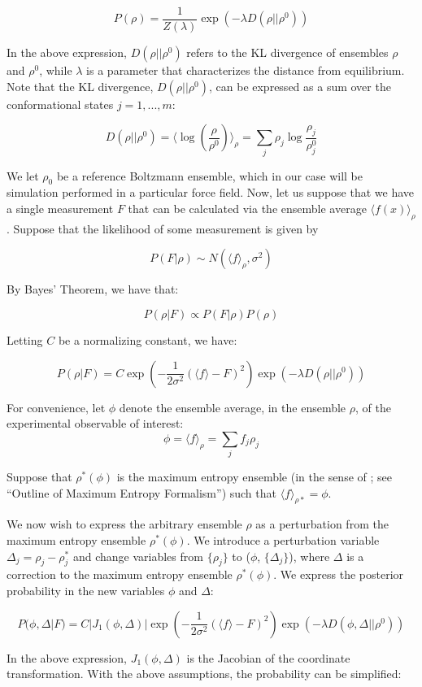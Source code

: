 \documentclass[12pt]{article}
\begin{document}
$$P(\rho) = \frac{1}{Z(\lambda)} \exp(- \lambda D(\rho || \rho^0))$$

In the above expression, $D(\rho || \rho^0)$ refers to the KL divergence of ensembles $\rho$ and $\rho^0$, while $\lambda$ is a parameter that characterizes the distance from equilibrium.  Note that the KL divergence, $D(\rho || \rho^0)$, can be expressed as a sum over the conformational states $j = 1, ..., m$:

$$D(\rho || \rho^0) = \langle \log(\frac{\rho}{\rho^0})\rangle_\rho = \sum_j \rho_j \log \frac{\rho_j}{\rho^0_j}$$

We let $\rho_0$ be a reference Boltzmann ensemble, which in our case will be simulation performed in a particular force field. Now, let us suppose that we have a single measurement $F$ that can be calculated via the ensemble average $\langle f(x) \rangle_\rho$.  Suppose that the likelihood of some measurement is given by

$$P(F|\rho) \sim N(\langle f\rangle_\rho, \sigma^2)$$

By Bayes' Theorem, we have that:

$$P(\rho | F) \propto P(F | \rho) P(\rho)$$

Letting $C$ be a normalizing constant, we have:

$$P(\rho | F) = C \exp(-\frac{1}{2\sigma^2} (\langle f \rangle - F)^2) \exp(-\lambda D(\rho || \rho^0))$$

For convenience, let $\phi$ denote the ensemble average, in the ensemble $\rho$, of the experimental observable of interest: 
$$\phi = \langle f \rangle_\rho = \sum_j f_j \rho_j$$

Suppose that $\rho^*(\phi)$ is the maximum entropy ensemble (in the sense of \cite{chodera2012}; see ``Outline of Maximum Entropy Formalism'') such that $\langle f \rangle_{\rho*} = \phi$.  

We now wish to express the arbitrary ensemble $\rho$ as a perturbation from the maximum entropy ensemble $\rho^*(\phi)$.  We introduce a perturbation variable $\Delta_j = \rho_j - \rho^*_j$ and change variables from $\{\rho_j\}$ to ($\phi$, $\{\Delta_j \}$), where $\Delta$ is a correction to the maximum entropy ensemble $\rho^*(\phi)$.  We express the posterior probability in the new variables $\phi$ and $\Delta$:

$$P(\phi, \Delta | F) = C |J_1(\phi, \Delta)| \exp(-\frac{1}{2\sigma^2} (\langle f \rangle - F)^2) \exp(-\lambda D(\phi, \Delta|| \rho^0)) $$

In the above expression, $J_1(\phi, \Delta)$ is the Jacobian of the coordinate transformation.  With the above assumptions, the probability can be simplified:
\end{document}
